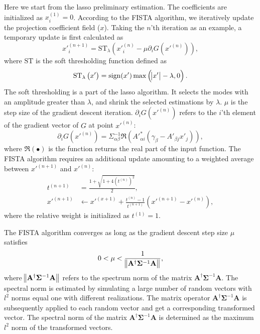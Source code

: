 \documentclass[twocolumn]{aastex63}
\begin{document}
Here we start from the lasso preliminary estimation. The coefficients are
initialized as $x_i^{(1)}=0$. According to the FISTA algorithm, we iteratively
update the projection coefficient field ($x$). Taking the $n$'th iteration as
an example, a temporary update is first calculated as
\begin{equation}
x'^{(n+1)}_{i}=\mathrm{ST}_{\lambda} \left(x'^{(n)}_{i} -\mu \partial_i G(x'^{(n)})\right),
\end{equation}
where $\mathrm{ST}$ is the soft thresholding function defined as
\begin{equation}
\mathrm{ST}_{\lambda} \left(x'\right) = \mathrm{sign} (x') \max \left(\abs{x'}-\lambda,0\right).
\end{equation}
The soft thresholding is a part of the lasso algorithm. It selects the
modes with an amplitude greater than $\lambda$, and shrink the selected
estimations by
$\lambda$.
$\mu$ is the step size of the gradient descent iteration.  $\partial_i
G(x'^{(n)})$ refers to the $i$'th element of the gradient vector of $G$ at
point $x'^{(n)}$:
\begin{equation}
\partial_i G(x'^{(n)})=\Sigma^{-1}_{\alpha\beta}\Re\left(A'^{*}_{\alpha i}(\gamma_{\beta}-A'_{\beta j}x'_{j})\right),
\end{equation}
where $\Re\left( \bullet \right)$ is the function returns the real part of the
input function. The FISTA algorithm requires an additional update amounting to a
weighted average between
$x'^{(n+1)}$ and $x'^{(n)}$:
\begin{equation}
\begin{split}
t^{(n+1)}&=\frac{1+\sqrt{1+4(t^{(n)})^2}}{2},\\
x'^{(n+1)} &\leftarrow x'^{(x+1)}+ \frac{t^{(n)}-1}{t^{(n+1)}}(x'^{(n+1)}-x'^{(n)}),
\end{split}
\end{equation}
where the relative weight is initialized as $t^{(1)}=1$.

The FISTA algorithm converges as long as the gradient descent step size $\mu$
satisfies
\begin{equation}
 0< \mu < \frac{1}{ \norm{\mathbf{A^{\dagger}} \mathbf{\Sigma}^{-1} \mathbf{A} }},
\end{equation}
where $\norm{\mathbf{A^{\dagger}} \mathbf{\Sigma}^{-1} \mathbf{A} }$ refers to
the spectrum norm of the matrix $\mathbf{A^{\dagger}} \mathbf{\Sigma}^{-1}
\mathbf{A}$. The spectral norm is estimated by simulating a large number of
random vectors with $l^2$ norms equal one with different realizations. The
matrix operator $\mathbf{A^{\dagger}} \mathbf{\Sigma}^{-1} \mathbf{A}$ is
subsequently applied to each random vector and get a corresponding transformed
vector. The spectral norm of the matrix $\mathbf{A^{\dagger}}
\mathbf{\Sigma}^{-1} \mathbf{A}$ is determined as the maximum $l^2$ norm of the
transformed vectors.
\end{document}
